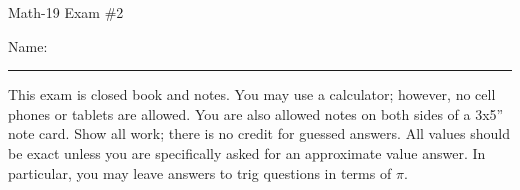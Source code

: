 \documentclass[letterpaper,12pt,fleqn]{article}
\begin{document}
\begin{center}
\Large Math-19 Exam \#2
\end{center}

\vspace{0.25in}

Name: \rule{4in}{1pt}

\vspace{0.25in}

This exam is closed book and notes. You may use a calculator; however, no cell
phones or tablets are allowed. You are also allowed notes on both sides of a
3x5'' note card. Show all work; there is no credit for guessed answers. All
values should be exact unless you are specifically asked for an approximate
value answer.  In particular, you may leave answers to trig questions in terms
of $\pi$.

\vspace{0.25in}
\end{document}
